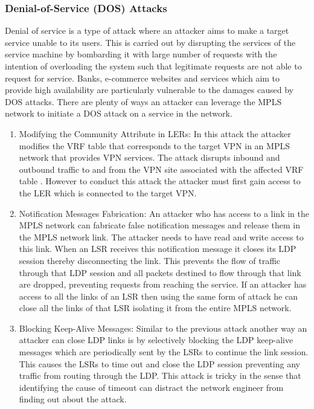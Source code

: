 \subsubsection {Denial-of-Service (DOS) Attacks}
Denial of service is a type of attack where an attacker aims to make a target service unable to its users. This is carried out by disrupting the services of the service machine by bombarding it with large number of requests with the intention of overloading the system such that legitimate requests are not able to request for service. Banks, e-commerce websites and services which aim to provide high availability are particularly vulnerable to the damages caused by DOS attacks. There are plenty of ways an attacker can leverage the MPLS network to initiate a DOS attack on a service in the network.

\begin{enumerate}
\item Modifying the Community Attribute in LERs:
In this attack the attacker modifies the VRF table that corresponds to the target VPN in an MPLS network that provides VPN services. The attack disrupts inbound and outbound traffic to and from the VPN site associated with the affected VRF table \cite{grayson2009analysis}. However to conduct this attack the attacker must first gain access to the LER which is connected to the target VPN.

\item Notification Messages Fabrication:
An attacker who has access to a link in the MPLS network can fabricate false notification messages and release them in the MPLS network link. The attacker needs to have read and write access to this link. When an LSR receives this notification message it closes its LDP session thereby disconnecting the link. This prevents the flow of traffic through that LDP session and all packets destined to flow through that link are dropped, preventing requests from reaching the service. If an attacker has access to all the links of an LSR then using the same form of attack he can close all the links of that LSR isolating it from the entire MPLS network.

\item Blocking Keep-Alive Messages:
Similar to the previous attack another way an attacker can close LDP links is by selectively blocking the LDP keep-alive messages which are periodically sent by the LSRs to continue the link session. This causes the LSRs to time out and close the LDP session preventing any traffic from routing through the LDP. This attack is tricky in the sense that identifying the cause of timeout can distract the network engineer from finding out about the attack.


\end{enumerate}

